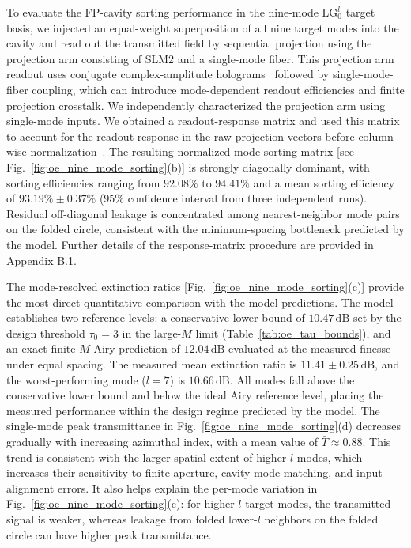 \documentclass{optica-article}
\begin{document}
To evaluate the FP-cavity sorting performance in the nine-mode $\mathrm{LG}_0^l$ target basis, we injected an equal-weight superposition of all nine target modes into the cavity and read out the transmitted field by sequential projection using the projection arm consisting of SLM2 and a single-mode fiber. This projection arm readout uses conjugate complex-amplitude holograms~\cite{Bolduc2013} followed by single-mode-fiber coupling, which can introduce mode-dependent readout efficiencies and finite projection crosstalk. We independently characterized the projection arm using single-mode inputs. We obtained a readout-response matrix and used this matrix to account for the readout response in the raw projection vectors before column-wise normalization~\cite{Carpenter2014,Rehacek2010}. The resulting normalized mode-sorting matrix [see Fig.~\ref{fig:oe_nine_mode_sorting}(b)] is strongly diagonally dominant, with sorting efficiencies ranging from $92.08\%$ to $94.41\%$ and a mean sorting efficiency of $93.19\%\pm0.37\%$ (95\% confidence interval from three independent runs). Residual off-diagonal leakage is concentrated among nearest-neighbor mode pairs on the folded circle, consistent with the minimum-spacing bottleneck predicted by the model. Further details of the response-matrix procedure are provided in Appendix B.1.

The mode-resolved extinction ratios [Fig.~\ref{fig:oe_nine_mode_sorting}(c)] provide the most direct quantitative comparison with the model predictions. The model establishes two reference levels: a conservative lower bound of $10.47\,\mathrm{dB}$ set by the design threshold $\tau_0=3$ in the large-$M$ limit (Table~\ref{tab:oe_tau_bounds}), and an exact finite-$M$ Airy prediction of $12.04\,\mathrm{dB}$ evaluated at the measured finesse under equal spacing. The measured mean extinction ratio is $11.41\pm0.25\,\mathrm{dB}$, and the worst-performing mode ($l=7$) is $10.66\,\mathrm{dB}$. All modes fall above the conservative lower bound and below the ideal Airy reference level, placing the measured performance within the design regime predicted by the model. The single-mode peak transmittance in Fig.~\ref{fig:oe_nine_mode_sorting}(d) decreases gradually with increasing azimuthal index, with a mean value of $\bar{T}\approx0.88$. This trend is consistent with the larger spatial extent of higher-$l$ modes, which increases their sensitivity to finite aperture, cavity-mode matching, and input-alignment errors. It also helps explain the per-mode variation in Fig.~\ref{fig:oe_nine_mode_sorting}(c): for higher-$l$ target modes, the transmitted signal is weaker, whereas leakage from folded lower-$l$ neighbors on the folded circle can have higher peak transmittance.
\end{document}

